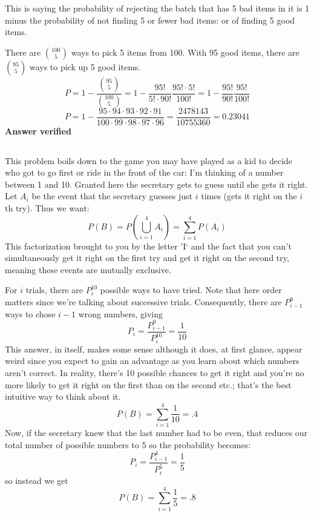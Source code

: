 This is saying the probability of rejecting the batch that has 5 bad items in it is 1 minus the probability of not finding 5 or fewer bad items: or of finding 5 good items.

There are $\binom{100}{5}$ ways to pick 5 items from 100.  With 95 good items, there are $\binom{95}{5}$ ways to pick up 5 good items.
\begin{equation}
	P = 1 - \frac{\binom{95}{5}}{\binom{100}{5}} = 1 - \frac{95!}{5! \cdot 90! } \frac{95! \cdot 5!}{100!} = 1 - \frac{95!}{90! } \frac{95!}{100!}
\end{equation}
\begin{equation}
	P = 1 - \frac{95\cdot 94\cdot 93\cdot 92\cdot 91}{100 \cdot 99\cdot 98\cdot 97\cdot 96} = \frac{2478143}{10755360} = 0.23041
\label{answer2.10}
\end{equation}
\textbf{Answer verified}

\subsection{}

This problem boils down to the game you may have played as a kid to decide who got to go first or ride in the front of the car: I'm thinking of a number between 1 and 10.  Granted here the secretary gets to guess until she gets it right.  Let $A_i$ be the event that the secretary guesses just $i$ times (gets it right on the $i$th try). Thus we want:
\begin{equation}
	P(B) = P\left(\bigcup_{i=1}^4 A_i \right) = \sum_{i=1}^4 P(A_i)
\end{equation}
This factorization brought to you by the letter 'I` and the fact that you can't simultaneously get it right on the first try and get it right on the second try, meaning these events are mutually exclusive.  

For $i$ trials, there are $P^{10}_i$ possible ways to have tried.  Note that here order matters since we're talking about successive trials.  Consequently, there are $P^9_{i-1}$ ways to chose $i-1$ wrong numbers, giving
\begin{equation}
	P_i=\frac{P^9_{i-1}}{P^{10}_i}=\frac{1}{10}
\end{equation}
This answer, in itself, makes some sense although it does, at first glance, appear weird since you expect to gain an advantage as you learn about which numbers aren't correct.  In reality, there's 10 possible chances to get it right and you're no more likely to get it right on the first than on the second etc.; that's the best intuitive way to think about it.
\begin{equation}
	P(B) = \sum_{i=1}^4 \frac{1}{10} = .4
\end{equation}
Now, if the secretary knew that the last number had to be even, that reduces our total number of possible numbers to 5 so the probability becomes:
\begin{equation}
	P_i=\frac{P^4_{i-1}}{P^{5}_i}=\frac{1}{5}
\end{equation}
so instead we get
\begin{equation}
	P(B) = \sum_{i=1}^4 \frac{1}{5} = .8
\end{equation}

